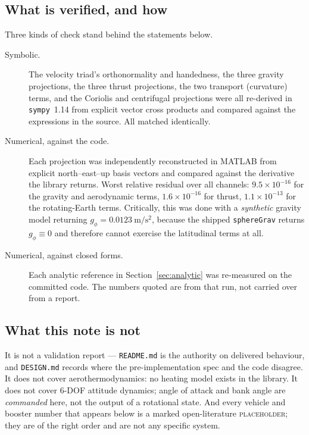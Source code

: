\documentclass[11pt]{article}
\newcommand{\code}[1]{\texttt{#1}}
\begin{document}
\subsection{What is verified, and how}
\label{sec:verify}

Three kinds of check stand behind the statements below.

\begin{description}
\item[Symbolic.] The velocity triad's orthonormality and handedness, the three
gravity projections, the three thrust projections, the two transport
(curvature) terms, and the Coriolis and centrifugal projections were all
re-derived in \code{sympy}~1.14 from explicit vector cross products and
compared against the expressions in the source. All matched identically.
\item[Numerical, against the code.] Each projection was independently
reconstructed in MATLAB from explicit north--east--up basis vectors and
compared against the derivative the library returns. Worst relative residual
over all channels: $9.5\times10^{-16}$ for the gravity and aerodynamic terms,
$1.6\times10^{-16}$ for thrust, $1.1\times10^{-13}$ for the rotating-Earth
terms. Critically, this was done with a \emph{synthetic} gravity model
returning $g_{\phi}=0.0123~\mathrm{m/s^2}$, because the shipped
\code{sphereGrav} returns $g_{\phi}\equiv0$ and therefore cannot exercise the
latitudinal terms at all.
\item[Numerical, against closed forms.] Each analytic reference in
Section~\ref{sec:analytic} was re-measured on the committed code. The numbers
quoted are from that run, not carried over from a report.
\end{description}

\subsection{What this note is not}

It is not a validation report --- \code{README.md} is the authority on
delivered behaviour, and \code{DESIGN.md} records where the
pre-implementation spec and the code disagree. It does not cover
aerothermodynamics: no heating model exists in the library. It does not cover
6-DOF attitude dynamics; angle of attack and bank angle are \emph{commanded}
here, not the output of a rotational state. And every vehicle and booster
number that appears below is a marked open-literature \textsc{placeholder};
they are of the right order and are not any specific system.
\end{document}
